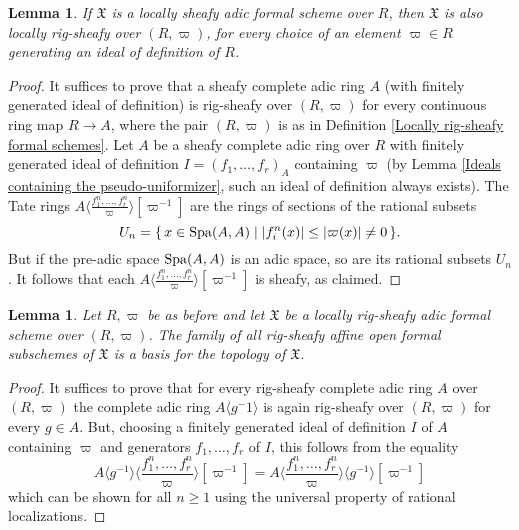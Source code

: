 \documentclass[12pt,twoside,a4paper]{article}
\newtheorem{lemma}[thm]{Lemma}
\theoremstyle{definition}
\theoremstyle{remark}
\newcommand\Spa{{\rm Spa}}
\begin{document}
\begin{lemma}\label{Locally sheafy implies locally rig-sheafy}If $\mathfrak{X}$ is a locally sheafy adic formal scheme over $R$, then $\mathfrak{X}$ is also locally rig-sheafy over $(R, \varpi)$, for every choice of an element $\varpi\in R$ generating an ideal of definition of $R$.\end{lemma}
\begin{proof}It suffices to prove that a sheafy complete adic ring $A$ (with finitely generated ideal of definition) is rig-sheafy over $(R, \varpi)$ for every continuous ring map $R\to A$, where the pair $(R, \varpi)$ is as in Definition \ref{Locally rig-sheafy formal schemes}. Let $A$ be a sheafy complete adic ring over $R$ with finitely generated ideal of definition $I=(f_1,\dots, f_r)_{A}$ containing $\varpi$ (by Lemma \ref{Ideals containing the pseudo-uniformizer}, such an ideal of definition always exists). The Tate rings $A\langle \frac{f_1^{n},\dots, f_r^{n}}{\varpi}\rangle[\varpi^{-1}]$ are the rings of sections of the rational subsets\begin{equation*}U_{n}=\{\, x\in \Spa(A, A)\mid \vert f_{i}^{n}(x)\vert\leq \vert \varpi(x)\vert\neq 0\,\}.\end{equation*}But if the pre-adic space $\Spa(A, A)$ is an adic space, so are its rational subsets $U_{n}$. It follows that each $A\langle\frac{f_1^{n},\dots, f_r^{n}}{\varpi}\rangle[\varpi^{-1}]$ is sheafy, as claimed.\end{proof}
\begin{lemma}\label{Topology on a locally rig-sheafy formal scheme}Let $R, \varpi$ be as before and let $\mathfrak{X}$ be a locally rig-sheafy adic formal scheme over $(R, \varpi)$. The family of all rig-sheafy affine open formal subschemes of $\mathfrak{X}$ is a basis for the topology of $\mathfrak{X}$.\end{lemma}
\begin{proof}It suffices to prove that for every rig-sheafy complete adic ring $A$ over $(R, \varpi)$ the complete adic ring $A\langle g^-1\rangle$ is again rig-sheafy over $(R, \varpi)$ for every $g\in A$. But, choosing a finitely generated ideal of definition $I$ of $A$ containing $\varpi$ and generators $f_1,\dots, f_r$ of $I$, this follows from the equality \begin{equation*}A\langle g^{-1}\rangle\langle\frac{f_1^n,\dots, f_r^{n}}{\varpi}\rangle[\varpi^{-1}]=A\langle\frac{f_1^n,\dots, f_r^{n}}{\varpi}\rangle\langle g^{-1}\rangle[\varpi^{-1}]\end{equation*}which can be shown for all $n\geq1$ using the universal property of rational localizations.\end{proof} 
\end{document}
